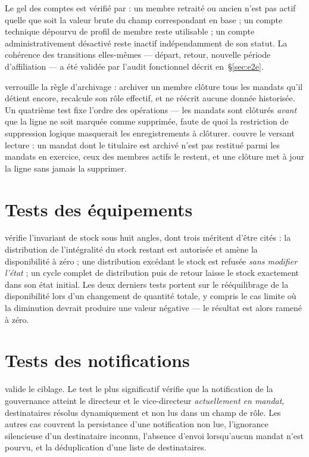 Le gel des comptes est vérifié par  : un membre retraité ou
ancien n'est pas actif quelle que soit la valeur brute du champ correspondant en base ; un
compte technique dépourvu de profil de membre reste utilisable ; un compte
administrativement désactivé reste inactif indépendamment de son statut. La cohérence des
transitions elles-mêmes --- départ, retour, nouvelle période d'affiliation --- a été
validée par l'audit fonctionnel décrit en~§\ref{sec:e2e}.

 verrouille la règle d'archivage : archiver un membre clôture tous
les mandats qu'il détient encore, recalcule son rôle effectif, et ne réécrit aucune donnée
historisée. Un quatrième test fixe l'ordre des opérations --- les mandats sont clôturés
\emph{avant} que la ligne ne soit marquée comme supprimée, faute de quoi la restriction de
suppression logique masquerait les enregistrements à clôturer. 
couvre le versant lecture : un mandat dont le titulaire est archivé n'est pas restitué
parmi les mandats en exercice, ceux des membres actifs le restent, et une clôture met à
jour la ligne sans jamais la supprimer.

\section{Tests des équipements}
\label{sec:testsequip}

 vérifie l'invariant de stock sous huit angles, dont trois
méritent d'être cités : la distribution de l'intégralité du stock restant est autorisée et
amène la disponibilité à zéro ; une distribution excédant le stock est refusée \emph{sans
modifier l'état} ; un cycle complet de distribution puis de retour laisse le stock
exactement dans son état initial. Les deux derniers tests portent sur le rééquilibrage de
la disponibilité lors d'un changement de quantité totale, y compris le cas limite où la
diminution devrait produire une valeur négative --- le résultat est alors ramené à zéro.

\section{Tests des notifications}

 valide le ciblage. Le test le plus significatif vérifie que
la notification de la gouvernance atteint le directeur et le vice-directeur
\emph{actuellement en mandat}, destinataires résolus dynamiquement et non lus dans un champ
de rôle. Les autres cas couvrent la persistance d'une notification non lue, l'ignorance
silencieuse d'un destinataire inconnu, l'absence d'envoi lorsqu'aucun mandat n'est pourvu,
et la déduplication d'une liste de destinataires.

